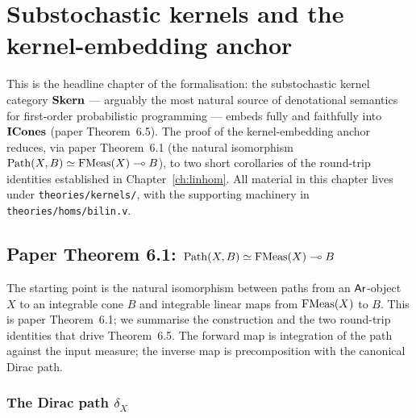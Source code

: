 %
%

\chapter{Substochastic kernels and the kernel-embedding anchor}\label{ch:skern}

This is the headline chapter of the formalisation: the substochastic
kernel category $\mathbf{Skern}$ --- arguably the most natural source of
denotational semantics for first-order probabilistic programming ---
embeds fully and faithfully into $\mathbf{ICones}$ (paper Theorem~6.5). The
proof of the kernel-embedding anchor reduces, via paper Theorem~6.1 (the
natural isomorphism $\mathrm{Path}(X, B) \simeq \mathrm{FMeas}(X) \multimap B$), to two
short corollaries of the round-trip identities established in
Chapter~\ref{ch:linhom}. All material in this chapter lives under
\texttt{theories/kernels/}, with the supporting machinery in
\texttt{theories/homs/bilin.v}.

\section{Paper Theorem 6.1: \texorpdfstring{$\mathrm{Path}(X, B) \simeq \mathrm{FMeas}(X) \multimap B$}{Path(X, B) ~= FMeas(X) -> B}}%
\label{sec:thm61}

The starting point is the natural isomorphism between paths from an
$\mathsf{Ar}$-object $X$ to an integrable cone $B$ and integrable linear maps
from $\mathrm{FMeas}(X)$ to $B$. This is paper Theorem~6.1; we summarise the
construction and the two round-trip identities that drive
Theorem~6.5. The forward map is integration of the path against the
input measure; the inverse map is precomposition with the canonical
Dirac path.

\subsection{The Dirac path \texorpdfstring{$\delta_X$}{delta_X}}\label{sec:dirac-path}

